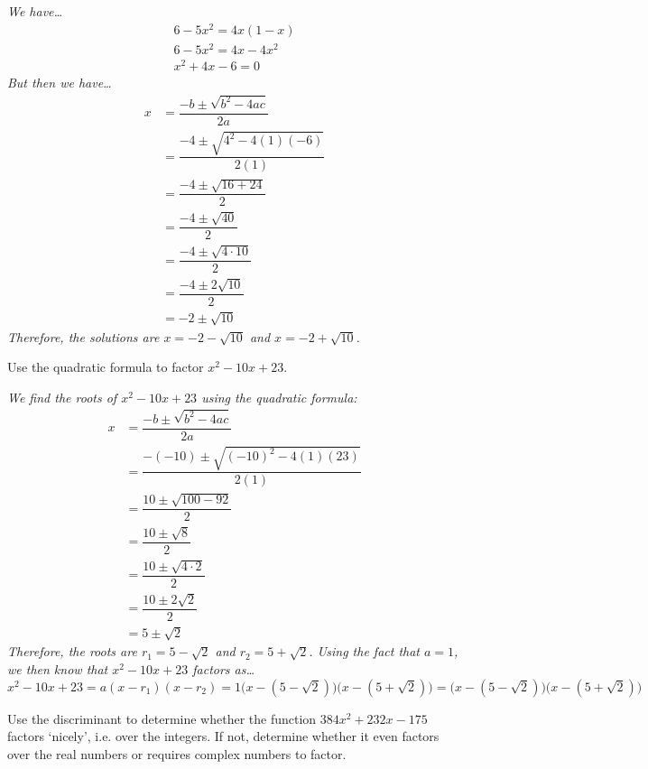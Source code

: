 \documentclass[12pt,letterpaper]{exam}
\begin{document}
\begin{questions}
{\itshape We have\dots
	\[
	\begin{aligned}
	6 - 5x^2= 4x(1 - x) \\[0.3cm]
	6 - 5x^2= 4x - 4x^2 \\[0.3cm]
	x^2 + 4x - 6= 0 
	\end{aligned}
	\] \pspace
But then we have\dots
	\[
	\begin{aligned}
	x&= \dfrac{-b \pm \sqrt{b^2 - 4ac}}{2a} \\[0.3cm]
	&=  \dfrac{-4 \pm \sqrt{4^2 - 4(1)(-6)}}{2(1)} \\[0.3cm]
	&=  \dfrac{-4 \pm \sqrt{16 + 24}}{2} \\[0.3cm]
	&= \dfrac{-4 \pm \sqrt{40}}{2} \\[0.3cm]
	&= \dfrac{-4 \pm \sqrt{4 \cdot 10}}{2} \\[0.3cm]
	&= \dfrac{-4 \pm 2\sqrt{10}}{2} \\[0.3cm]
	&= -2 \pm \sqrt{10}
	\end{aligned}
	\] \pspace
Therefore, the solutions are $x= -2 - \sqrt{10}$ and $x= -2 + \sqrt{10}$. 
}



\newpage
\question[10] Use the quadratic formula to factor $x^2 - 10x + 23$. \pspace

{\itshape We find the roots of $x^2 - 10x + 23$ using the quadratic formula: \pspace
	\[
	\begin{aligned}
	x&= \dfrac{-b \pm \sqrt{b^2 - 4ac}}{2a} \\[0.3cm]
	&=  \dfrac{-(-10) \pm \sqrt{(-10)^2 - 4(1)(23)}}{2(1)} \\[0.3cm]
	&= \dfrac{10 \pm \sqrt{100 - 92}}{2} \\[0.3cm]
	&= \dfrac{10 \pm \sqrt{8}}{2} \\[0.3cm]
	&= \dfrac{10 \pm \sqrt{4 \cdot 2}}{2} \\[0.3cm]
	&= \dfrac{10 \pm 2\sqrt{2}}{2} \\[0.3cm]
	&= 5 \pm \sqrt{2}
	\end{aligned}
	\] \pspace
Therefore, the roots are $r_1= 5 - \sqrt{2}$ and $r_2= 5 + \sqrt{2}$. Using the fact that $a= 1$, we then know that $x^2 - 10x + 23$ factors as\dots \pspace
	\[
	x^2 - 10x + 23= a(x - r_1)(x - r_2)= 1 \big(x - (5 - \sqrt{2}) \big)  \big(x - (5 + \sqrt{2}) \big)=  \big(x - (5 - \sqrt{2}) \big)  \big(x - (5 + \sqrt{2}) \big)
	\]
}



\newpage
\question[10] Use the discriminant to determine whether the function $384x^2 + 232x - 175$ factors `nicely', i.e. over the integers. If not, determine whether it even factors over the real numbers or requires complex numbers to factor. \pspace


\end{questions}
\end{document}
